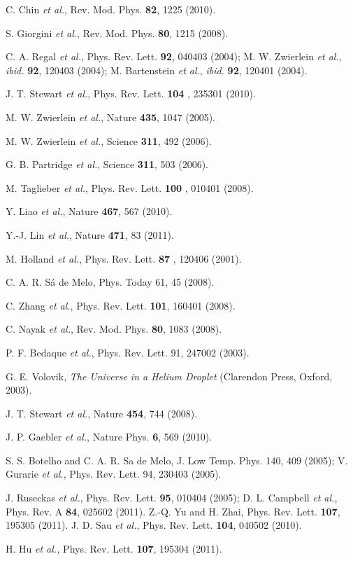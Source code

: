 \documentclass[prl,showpacs,twocolumn]{revtex4-1}
\begin{document}
\begin{thebibliography}{99}
 C. Chin \textit{et al.}, Rev. Mod. Phys. \textbf{82}, 1225
(2010).

 S. Giorgini \textit{et al.}, Rev. Mod. Phys. \textbf{80},
1215 (2008).

 C. A. Regal \textit{et al.}, Phys. Rev. Lett. \textbf{92},
040403 (2004); M. W. Zwierlein \textit{et al.}, \textit{ibid.} \textbf{92},
120403 (2004); M. Bartenstein \textit{et al.}, \textit{ibid.} \textbf{92},
120401 (2004).

 J. T. Stewart \textit{et al.}, Phys. Rev. Lett. \textbf{104%
}, 235301 (2010).

 M. W. Zwierlein \textit{et al.}, Nature \textbf{435},
1047 (2005).

 M. W. Zwierlein \textit{et al.}, Science \textbf{311}, 492
(2006).

 G. B. Partridge \textit{et al.}, Science \textbf{311}, 503
(2006).

 M. Taglieber \textit{et al.}, Phys. Rev. Lett. \textbf{100%
}, 010401 (2008).

 Y. Liao \textit{et al.}, Nature \textbf{467}, 567 (2010).

 Y.-J. Lin \textit{et al.}, Nature \textbf{471}, 83 (2011).

 M. Holland \textit{et al.}, Phys. Rev. Lett. \textbf{87}%
, 120406 (2001).

 C. A. R. S\'{a} de Melo, Phys. Today 61, 45 (2008).

 C. Zhang \textit{et al.}, Phys. Rev. Lett. \textbf{101},
160401 (2008).

 C. Nayak \textit{et al.}, Rev. Mod. Phys. \textbf{80}, 1083
(2008).

 P. F. Bedaque \textit{et al.}, Phys. Rev. Lett. 91, 247002
(2003).

 G. E. Volovik, \textit{The Universe in a Helium Droplet}
(Clarendon Press, Oxford, 2003).

 J. T. Stewart \textit{et al.}, Nature \textbf{454}, 744
(2008).

 J. P. Gaebler \textit{et al.}, Nature Phys. \textbf{6}, 569
(2010).

 S. S. Botelho and C. A. R. Sa de Melo, J. Low Temp. Phys.
140, 409 (2005); V. Gurarie \textit{et al.}, Phys. Rev. Lett. 94, 230403
(2005).

 J. Ruseckas \textit{et al.}, Phys. Rev. Lett. \textbf{95},
010404 (2005); D. L. Campbell \textit{et al.}, Phys.
Rev. A \textbf{84}, 025602 (2011).
 Z.-Q. Yu and H. Zhai, Phys. Rev. Lett. \textbf{107},
195305 (2011).
 J. D. Sau \textit{et al.}, Phys. Rev. Lett. \textbf{104},
040502 (2010).



 H. Hu \textit{et al.,} Phys. Rev. Lett. \textbf{107},
195304 (2011).
\end{thebibliography}
\end{document}
